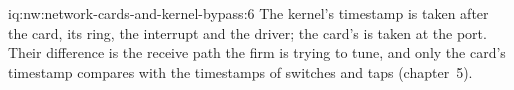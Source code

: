 \begin{solution}{iq:nw:network-cards-and-kernel-bypass:6}
The kernel's timestamp is taken after the card, its ring, the interrupt and the driver; the card's is taken at the port. Their
difference is the receive path the firm is trying to tune, and only the card's timestamp compares with the timestamps of switches and
taps (chapter~5).
\end{solution}
